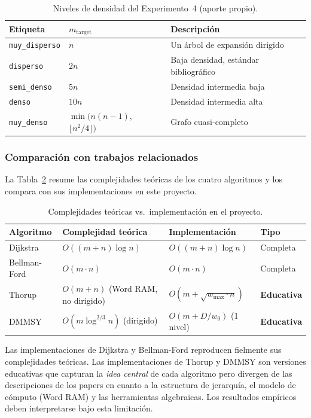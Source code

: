 \begin{table}[H]
  \centering
  \caption{Niveles de densidad del Experimento~4 (aporte propio).}
  \label{tab:densidades}
  \begin{tabular}{l p{2cm} p{4cm}}
    \toprule
    \textbf{Etiqueta} & \textbf{$m_{\text{target}}$} & \textbf{Descripción} \\
    \midrule
    \texttt{muy\_disperso} & $n$             & Un árbol de expansión dirigido \\
    \texttt{disperso}      & $2n$            & Baja densidad, estándar bibliográfico \\
    \texttt{semi\_denso}   & $5n$            & Densidad intermedia baja \\
    \texttt{denso}         & $10n$           & Densidad intermedia alta \\
    \texttt{muy\_denso}    & $\min(n(n-1),$ $\lfloor n^2/4\rfloor)$
                           & Grafo cuasi-completo \\
    \bottomrule
  \end{tabular}
\end{table}

\subsubsection{Comparación con trabajos relacionados}

La Tabla~\ref{tab:complejidades_proyecto} resume las complejidades teóricas de los
cuatro algoritmos y los compara con sus implementaciones en este proyecto.

\begin{table}[t]
  \centering
  \caption{Complejidades teóricas vs.\ implementación en el proyecto.}
  \label{tab:complejidades_proyecto}
  \begin{tabular}{p{3cm} p{3.2cm} p{3.2cm} l}
    \toprule
    \textbf{Algoritmo} & \textbf{Complejidad teórica} &
    \textbf{Implementación} & \textbf{Tipo} \\
    \midrule
    Dijkstra \cite{dijkstra1959} &
      $O((m+n)\log n)$ &
      $O((m+n)\log n)$ & Completa \\[4pt]
    Bellman-Ford \cite{bellman1958} &
      $O(m \cdot n)$ &
      $O(m \cdot n)$ & Completa \\[4pt]
    Thorup \cite{thorup1999} &
      $O(m+n)$ (Word RAM, no dirigido) &
      $O(m+\sqrt{w_{\max}\cdot n})$ & \textbf{Educativa} \\[4pt]
    DMMSY \cite{duan2025} &
      $O(m\log^{2/3}n)$ (dirigido) &
      $O(m + D/w_0)$ (1 nivel) & \textbf{Educativa} \\
    \bottomrule
  \end{tabular}
\end{table}

Las implementaciones de Dijkstra y Bellman-Ford reproducen fielmente sus
complejidades teóricas. Las implementaciones de Thorup y DMMSY son versiones
educativas que capturan la \textit{idea central} de cada algoritmo pero
divergen de las descripciones de los papers en cuanto a la estructura de
jerarquía, el modelo de cómputo (Word RAM) y las herramientas algebraicas.
Los resultados empíricos deben interpretarse bajo esta limitación.
